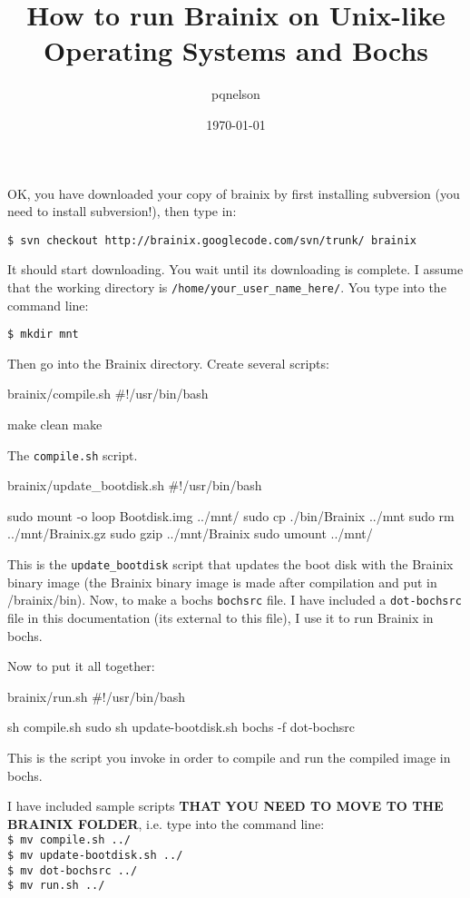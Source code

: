 \documentclass{article}
\title{How to run Brainix on Unix-like Operating Systems and Bochs}
\author{pqnelson}
\date{\today}
\begin{document}
 \maketitle

OK, you have downloaded your copy of brainix by first installing subversion (you need to install subversion!), then type in:

\verb|$ svn checkout http://brainix.googlecode.com/svn/trunk/ brainix|

It should start downloading. You wait until its downloading is complete. I assume that the working directory is \verb|/home/your_user_name_here/|. You type into the command line:

\verb|$ mkdir mnt|

Then go into the Brainix directory. Create several scripts:
\begin{code}{brainix/compile.sh}
#!/usr/bin/bash

make clean
make
\end{code}
The \verb|compile.sh| script.
\begin{code}{brainix/update\_bootdisk.sh}
#!/usr/bin/bash

sudo mount -o loop Bootdisk.img ../mnt/
sudo cp ./bin/Brainix ../mnt
sudo rm ../mnt/Brainix.gz
sudo gzip ../mnt/Brainix
sudo umount ../mnt/
\end{code}
This is the \verb|update_bootdisk| script that updates the boot disk with the Brainix binary image (the Brainix binary image is made after compilation and put in /brainix/bin). Now, to make a bochs \verb|bochsrc| file. I have included a \verb|dot-bochsrc| file in this documentation (its external to this file), I use it to run Brainix in bochs.

Now to put it all together:
\begin{code}{brainix/run.sh}
#!/usr/bin/bash

sh compile.sh
sudo sh update-bootdisk.sh
bochs -f dot-bochsrc
\end{code}
This is the script you invoke in order to compile and run the compiled image in bochs.

I have included sample scripts \textbf{THAT YOU NEED TO MOVE TO THE BRAINIX FOLDER}, i.e. type into the command line:
\\
\verb|$ mv compile.sh ../|
\\
\verb|$ mv update-bootdisk.sh ../|
\\
\verb|$ mv dot-bochsrc ../|
\\
\verb|$ mv run.sh ../|
\end{document}
